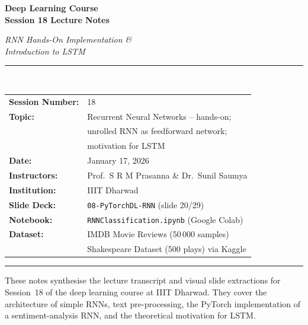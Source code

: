 \documentclass[12pt,a4paper]{article}
\begin{document}

\begin{titlepage}
  \centering
  \vspace*{2cm}
  {\Huge\bfseries Deep Learning Course\\[0.4em]
   Session 18 Lecture Notes\par}
  \vspace{1.2cm}
  {\LARGE\itshape RNN Hands-On Implementation \&\\[0.3em]
   Introduction to LSTM\par}
  \vspace{1.5cm}
  \rule{\linewidth}{0.6pt}\\[0.4cm]
  \begin{tabular}{ll}
    \textbf{Session Number:}  & 18 \\[4pt]
    \textbf{Topic:}           & Recurrent Neural Networks -- hands-on; \\
                              & unrolled RNN as feedforward network; \\
                              & motivation for LSTM \\[4pt]
    \textbf{Date:}            & January 17, 2026 \\[4pt]
    \textbf{Instructors:}     & Prof.\ S R M Prasanna \& Dr.\ Sunil Saumya \\[4pt]
    \textbf{Institution:}     & IIIT Dharwad \\[4pt]
    \textbf{Slide Deck:}      & \texttt{08-PyTorchDL-RNN} (slide 20/29) \\[4pt]
    \textbf{Notebook:}        & \texttt{RNNClassification.ipynb} (Google Colab) \\[4pt]
    \textbf{Dataset:}         & IMDB Movie Reviews (50\,000 samples) \\
                              & Shakespeare Dataset (500 plays) via Kaggle \\
  \end{tabular}
  \rule{\linewidth}{0.6pt}
  \vfill
  {\large These notes synthesise the lecture transcript and visual slide
   extractions for Session~18 of the deep learning course at IIIT Dharwad.
   They cover the architecture of simple RNNs, text pre-processing,
   the PyTorch implementation of a sentiment-analysis RNN, and the
   theoretical motivation for LSTM.\par}
\end{titlepage}
\end{document}

